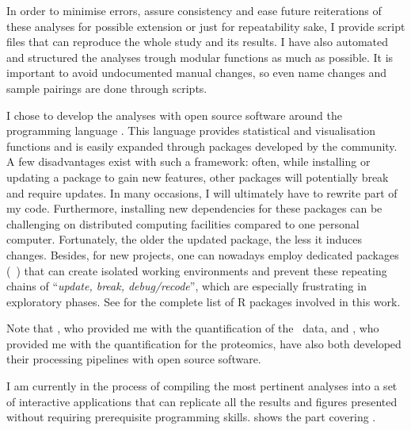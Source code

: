 In order to minimise errors,
assure consistency and ease future reiterations of these analyses
for possible extension or just for repeatability sake,
I provide script files that can reproduce the whole study and its results.
I have also automated and structured the analyses trough modular functions
as much as possible.
It is important to avoid undocumented manual changes,
so even name changes and sample pairings are done through scripts.

I chose to develop the analyses with open source software
around the programming language .
This language provides statistical and visualisation functions
and is easily expanded through packages developed by the community.
A few disadvantages exist with such a framework:
often, while installing or updating a package to gain new features,
other packages will potentially break and require updates.
In many occasions, I will ultimately have to rewrite part of my code.
Furthermore, installing new dependencies for these packages can be challenging
on distributed computing facilities compared to one personal computer.
Fortunately, the older the updated package, the less it induces changes.
Besides, for new projects, one can nowadays employ dedicated packages
(\eg\ )
that can create isolated working environments and
prevent these repeating chains of \enquote{\emph{update, break, debug/recode}},
which are especially frustrating in exploratory phases.
See  for the complete list of \textsf{R} packages
involved in this work.

Note that \nuno, who provided me with the quantification of the \gtex\ data,
and \james, who provided me with the quantification for the proteomics,
have also both developed their processing pipelines with open source software.

I am currently in the process of compiling the most pertinent analyses
into a set of interactive applications
that can replicate all the results and figures presented
without requiring prerequisite programming skills.
 shows the part covering .




